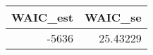 \begin{longtable}{rr}
\toprule
WAIC\_est & WAIC\_se \\ 
\midrule
-5636 & 25.43229 \\ 
\bottomrule
\end{longtable}

